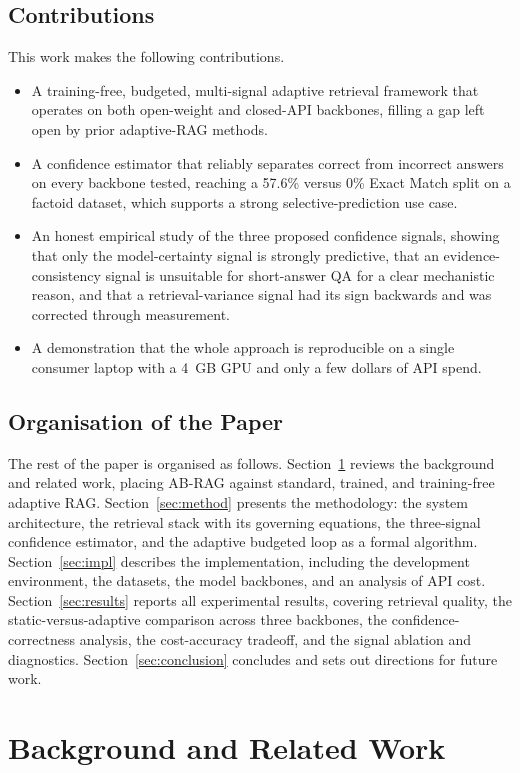 \documentclass[conference,a4paper,10pt]{IEEEtran}
\begin{document}
\subsection{Contributions}
This work makes the following contributions.
\begin{itemize}
\item A training-free, budgeted, multi-signal adaptive retrieval framework that operates
on both open-weight and closed-API backbones, filling a gap left open by prior
adaptive-RAG methods.
\item A confidence estimator that reliably separates correct from incorrect answers on
every backbone tested, reaching a 57.6\% versus 0\% Exact Match split on a factoid
dataset, which supports a strong selective-prediction use case.
\item An honest empirical study of the three proposed confidence signals, showing that
only the model-certainty signal is strongly predictive, that an evidence-consistency
signal is unsuitable for short-answer QA for a clear mechanistic reason, and that a
retrieval-variance signal had its sign backwards and was corrected through measurement.
\item A demonstration that the whole approach is reproducible on a single consumer
laptop with a 4~GB GPU and only a few dollars of API spend.
\end{itemize}

\subsection{Organisation of the Paper}
The rest of the paper is organised as follows. Section~\ref{sec:related} reviews the
background and related work, placing AB-RAG against standard, trained, and training-free
adaptive RAG. Section~\ref{sec:method} presents the methodology: the system
architecture, the retrieval stack with its governing equations, the three-signal
confidence estimator, and the adaptive budgeted loop as a formal algorithm.
Section~\ref{sec:impl} describes the implementation, including the development
environment, the datasets, the model backbones, and an analysis of API cost.
Section~\ref{sec:results} reports all experimental results, covering retrieval quality,
the static-versus-adaptive comparison across three backbones, the confidence-correctness
analysis, the cost-accuracy tradeoff, and the signal ablation and diagnostics.
Section~\ref{sec:conclusion} concludes and sets out directions for future work.

\section{Background and Related Work}
\label{sec:related}
\end{document}

